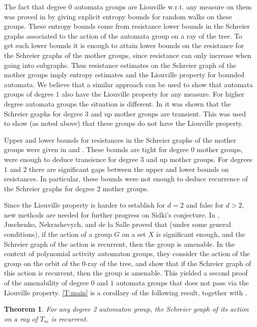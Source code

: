 \documentclass[12pt]{article}
\newtheorem{thm}{Theorem}[section]
\theoremstyle{definition}
\numberwithin{equation}{section}
\begin{document}
The fact that degree $0$ automata groups are Liouville w.r.t. any measure on them was proved in \cite{AAMBV} by giving explicit entropy bounds for random walks on these groups.
These entropy bounds come from resistance lower bounds in the Schreier graphs associated to the action of the automata group on a ray of the tree.
To get such lower bounds it is enough to attain lower bounds on the resistance for the Schreier graphs of the mother groups, since resistance can only increase when going into subgraphs.
Thus resistance estimates on the Schreier graph of the mother groups imply entropy estimates and the Liouville property for bounded automata.
We believe that a similar approach can be used to show that automata groups of degree $1$ also have the Liouville property for any measure.
For higher degree automata groups the situation is different.
In \cite{AV} it was shown that the Schreier graphs for degree $3$ and up mother groups are transient.
This was used to show (as noted above) that these groups do not have the Liouville property.

Upper and lower bounds for resistances in the Schreier graphs of the mother groups were given in \cite{AV} and \cite{AAMBV}.
These bounds are tight for degree $0$ mother groups, were enough to deduce transience for degree $3$ and up mother groups.
For degrees $1$ and $2$ there are significant gaps between the upper and lower bounds on resistances.
In particular, these bounds were not enough to deduce recurrence of the Schreier graphs for degree $2$ mother groups.

\medskip
Since the Liouville property is harder to establish for $d=2$ and false for $d>2$, new methods are needed for further progress on Sidki's conjecture.
In \cite{JNS}, Juschenko, Nekrashevych, and de la Salle proved that (under some general conditions), if the action of a group $G$ on a set $X$ is significant enough, and the Schreier graph of the action is recurrent, then the group is amenable.
In the context of polynomial activity automaton groups,
they consider the action of the group on the orbit of the $0$-ray of the tree, and show that if the Schreier graph of this action is recurrent, then the group is amenable.
This yielded a second proof of the amenability of degree $0$ and $1$ automata groups that does not pass via the Liouville property.
\cref{T:main} is a corollary of the following result, together with \cite[Theorem 5.2]{JNS}.

\begin{thm}\label{T:d2rec}
  For any degree 2 automaton group, the Schreier graph of its action on a ray of $T_m$ is recurrent.
\end{thm}
\end{document}
